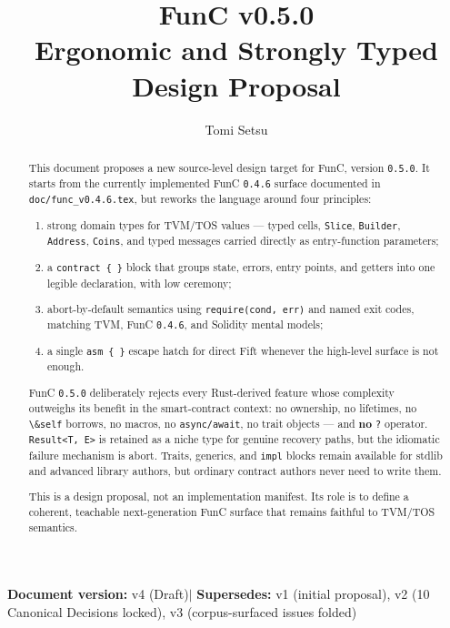 \documentclass[12pt,oneside]{article}
\title{FunC v0.5.0\\Ergonomic and Strongly Typed Design Proposal}
\author{Tomi Setsu}
\begin{document}
\maketitle

\begin{center}
\textbf{Document version:} v4 (Draft)\quad$\vert$\quad
\textbf{Supersedes:} v1 (initial proposal), v2 (10 Canonical Decisions
locked), v3 (corpus-surfaced issues folded)
\end{center}

\begin{abstract}
This document proposes a new source-level design target for FunC,
version \verb|0.5.0|. It starts from the currently implemented FunC
\verb|0.4.6| surface documented in \verb|doc/func_v0.4.6.tex|, but reworks the
language around four principles:

\begin{enumerate}
\item strong domain types for TVM/TOS values --- typed cells,
\verb|Slice|, \verb|Builder|, \verb|Address|, \verb|Coins|, and typed
messages carried directly as entry-function parameters;
\item a \verb|contract { }| block that groups state, errors, entry
points, and getters into one legible declaration, with low ceremony;
\item abort-by-default semantics using \verb|require(cond, err)| and
named exit codes, matching TVM, FunC \verb|0.4.6|, and Solidity mental
models;
\item a single \verb|asm { }| escape hatch for direct Fift whenever the
high-level surface is not enough.
\end{enumerate}

FunC \verb|0.5.0| deliberately rejects every Rust-derived feature whose
complexity outweighs its benefit in the smart-contract context: no
ownership, no lifetimes, no \verb|\&self| borrows, no macros, no
\verb|async/await|, no trait objects --- and \textbf{no} \verb|?|
operator. \verb|Result<T, E>| is retained as a niche type for genuine
recovery paths, but the idiomatic failure mechanism is abort. Traits,
generics, and \verb|impl| blocks remain available for stdlib and
advanced library authors, but ordinary contract authors never need to
write them.

This is a design proposal, not an implementation manifest. Its role is
to define a coherent, teachable next-generation FunC surface that
remains faithful to TVM/TOS semantics.
\end{abstract}
\end{document}
